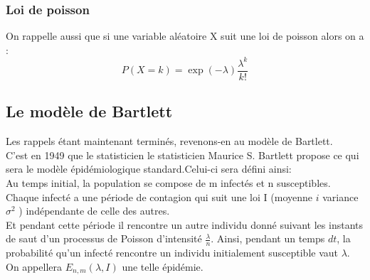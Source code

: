\subsubsection{Loi de poisson}
On rappelle aussi que si une variable aléatoire X suit une loi de poisson alors on a :\\
$$ P(X=k) = \exp(-\lambda)\frac{\lambda^k}{k!} $$

    	 
\subsection{Le modèle de Bartlett}
Les rappels étant maintenant terminés, revenons-en au modèle de Bartlett.\\
C’est en 1949 que le statisticien le statisticien Maurice S. Bartlett propose ce qui sera le modèle épidémiologique standard.Celui-ci sera défini ainsi:\\
Au temps initial, la population se compose de m infectés et n susceptibles. Chaque infecté a une période de contagion qui suit une loi I (moyenne $i$ variance $\sigma^2$ ) indépendante de celle des autres.\\
Et pendant cette période il rencontre un autre individu donné suivant les instants de saut d’un processus de Poisson d’intensité $\frac{\lambda}{n}$. Ainsi, pendant un temps $dt$, la probabilité qu’un infecté rencontre un individu initialement susceptible vaut $\lambda$. \\
On appellera $E_{n,m}(\lambda, I)$ une telle épidémie.


